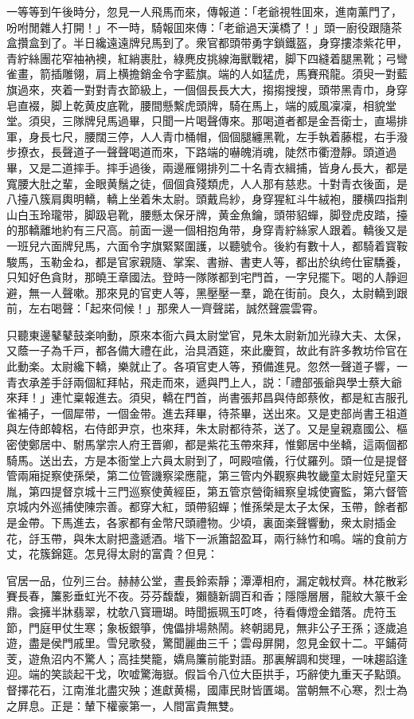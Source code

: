 一等等到午後時分，忽見一人飛馬而來，傳報道：「老爺視牲囬來，進南薰門了，吩咐閒雜人打開！」不一時，騎報囬來傳：「老爺過天漢橋了！」頭一廚役跟隨茶盒攢盒到了。半日纔遠遠牌兒馬到了。衆官都頭带勇字鎖鐵盔，身穿摟漆紫花甲，青紵絲團花窄袖衲襖，紅綃裹肚，綠麂皮挑線海獸戰裙，脚下四縫着腿黑靴；弓彎雀畫，箭插雕翎，肩上横擔銷金令字藍旗。端的人如猛虎，馬賽飛龍。須臾一對藍旗過來，夾着一對對青衣節級上，一個個長長大大，搊搊搜搜，頭带黑青巾，身穿皂直裰，脚上乾黄皮底靴，腰間懸繫虎頭牌，騎在馬上，端的威風凜凜，相貌堂堂。須臾，三隊牌兒馬過畢，只聞一片喝聲傳來。那喝道者都是金吾衛士，直場排軍，身長七尺，腰闊三停，人人青巾桶帽，個個腿纏黑靴，左手執着藤棍，右手潑步撩衣，長聲道子一聲聲喝道而來，下路端的嚇魄消魂，陡然市衢澄靜。頭道過畢，又是二道摔手。摔手過後，兩邊雁翎排列二十名青衣緝捕，皆身ん長大，都是寬腰大肚之輩，金眼黄鬚之徒，個個貪殘類虎，人人那有慈悲。十對青衣後面，是八擡八簇肩輿明轎，轎上坐着朱太尉。頭戴烏紗，身穿猩紅斗牛絨袍，腰横四指荆山白玉玲瓏带，脚趿皂靴，腰懸太保牙牌，黄金魚鑰，頭带貂蟬，脚登虎皮踏，擡的那轎離地約有三尺高。前面一邊一個相抱角带，身穿青紵絲家人跟着。轎後又是一班兒六面牌兒馬，六面令字旗緊緊圍護，以聽號令。後約有數十人，都騎着寳鞍駿馬，玉勒金ね，都是官家親隨、掌案、書辦、書吏人等，都出於纨绔仕宦驕養，只知好色貪財，那曉王章國法。登時一隊隊都到宅門首，一字兒擺下。喝的人靜迴避，無一人聲嗽。那來見的官吏人等，黑壓壓一羣，跪在街前。良久，太尉轎到跟前，左右喝聲：「起來伺候！」那衆人一齊聲諾，誠然聲震雲霄。

只聽東邊鼕鼕鼓楽响動，原來本衙六員太尉堂官，見朱太尉新加光祿大夫、太保，又蔭一子為千戸，都各備大禮在此，治具酒筵，來此慶賀，故此有許多教坊伶官在此動楽。太尉纔下轎，樂就止了。各項官吏人等，預備進見。忽然一聲道子響，一青衣承差手㧱兩個紅拜帖，飛走而來，遞與門上人，説：「禮部張爺與學士蔡大爺來拜！」連忙稟報進去。須臾，轎在門首，尚書張邦昌與侍郎蔡攸，都是紅吉服孔雀補子，一個犀带，一個金带。進去拜畢，待茶畢，送出來。又是吏部尚書王祖道與左侍郎韓梠，右侍郎尹京，也來拜，朱太尉都待茶，送了。又是皇親嘉國公、樞密使鄭居中、駙馬掌宗人府王晋卿，都是紫花玉帶來拜，惟鄭居中坐轎，這兩個都騎馬。送出去，方是本衙堂上六員太尉到了，呵殿喧儀，行仗羅列。頭一位是提督管兩廂捉察使孫榮，第二位管譏察梁應龍，第三管内外觀察典牧畿童太尉姪兒童天胤，第四提督京城十三門巡察使黄經臣，第五管京營衛緝察皇城使竇監，第六督管京城内外巡捕使陳宗善。都穿大紅，頭帶貂蟬；惟孫榮是太子太保，玉帶，餘者都是金帶。下馬進去，各家都有金幣尺頭禮物。少頃，裏面楽聲響動，衆太尉插金花，㧱玉帶，與朱太尉把盞遞酒。堦下一派簫韶盈耳，兩行絲竹和鳴。端的食前方丈，花簇錦筵。怎見得太尉的富貴？但見：

\begin{myquote}
官居一品，位列三台。赫赫公堂，晝長鈴索靜；潭潭相府，漏定戟杖齊。林花散彩賽長春，簾影垂虹光不夜。芬芬馥馥，獺髓新調百和香；隱隱層層，龍紋大篆千金鼎。衾擁半牀翡翠，枕欹八寳珊瑚。時聞振珮玉叮咚，待看傳燈金錯落。虎符玉節，門庭甲仗生寒；象板銀箏，傀儡排場熱鬧。終朝謁見，無非公子王孫；逐歲追遊，盡是侯門戚里。雪兒歌發，驚聞麗曲三千；雲母屏開，忽見金釵十二。平鋪荷芰，遊魚沼内不驚人；高挂樊籠，嬌鳥簾前能對語。那裏解調和爕理，一味趨諂逢迎。端的笑談起干戈，吹嘘驚海嶽。假旨令八位大臣拱手，巧辭使九重天子點頭。督擇花石，江南淮北盡灾殃；進獻黄楊，國庫民財皆匱竭。當朝無不心寒，烈士為之屛息。正是：輦下權豪第一，人間富貴無雙。
\end{myquote}

